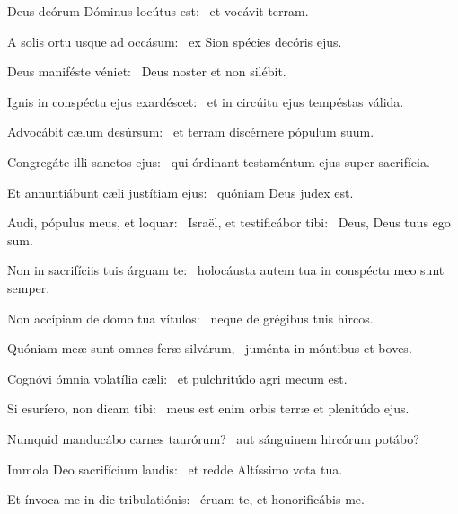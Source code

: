 \item Deus deórum Dóminus locútus est:~\psstar{} et vocávit terram.

\item A solis ortu usque ad occásum:~\psstar{} ex Sion spécies decóris ejus.

\item Deus maniféste véniet:~\psstar{} Deus noster et non silébit.

\item Ignis in conspéctu ejus exardéscet:~\psstar{} et in circúitu ejus tempéstas válida.

\item Advocábit cælum desúrsum:~\psstar{} et terram discérnere pópulum suum.

\item Congregáte illi sanctos ejus:~\psstar{} qui órdinant testaméntum ejus super sacrifícia.

\item Et annuntiábunt cæli justítiam ejus:~\psstar{} quóniam Deus judex est.

\item Audi, pópulus meus, et loquar:~\pscross{} Israël, et testificábor tibi:~\psstar{} Deus, Deus tuus ego sum.

\item Non in sacrifíciis tuis árguam te:~\psstar{} holocáusta autem tua in conspéctu meo sunt semper.

\item Non accípiam de domo tua vítulos:~\psstar{} neque de grégibus tuis hircos.

\item Quóniam meæ sunt omnes feræ silvárum,~\psstar{} juménta in móntibus et boves.

\item Cognóvi ómnia volatília cæli:~\psstar{} et pulchritúdo agri mecum est.

\item Si esuríero, non dicam tibi:~\psstar{} meus est enim orbis terræ et plenitúdo ejus.

\item Numquid manducábo carnes taurórum?~\psstar{} aut sánguinem hircórum potábo?

\item Immola Deo sacrifícium laudis:~\psstar{} et redde Altíssimo vota tua.

\item Et ínvoca me in die tribulatiónis:~\psstar{} éruam te, et honorificábis me.

